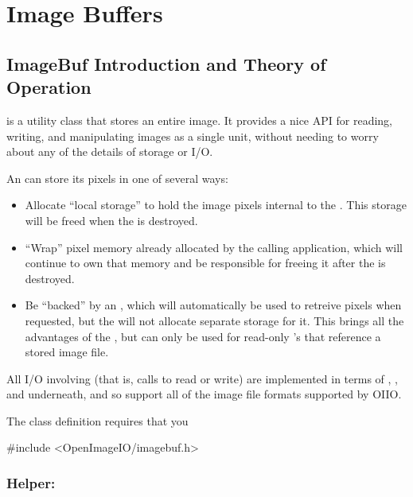 \chapter{Image Buffers}
\label{chap:imagebuf}

\section{ImageBuf Introduction and Theory of Operation}
\label{sec:imagebuf:intro}

\ImageBuf is a utility class that stores an entire image.  It provides a
nice API for reading, writing, and manipulating images as a single unit,
without needing to worry about any of the details of storage or I/O.

\smallskip

\noindent An \ImageBuf can store its pixels in one of several ways:

\begin{itemize}
\item Allocate ``local storage'' to hold the image pixels
internal to the \ImageBuf.  This storage will be freed when the
\ImageBuf is destroyed.
\item ``Wrap'' pixel memory already allocated by the calling application,
which will continue to own that memory and be responsible for freeing
it after the \ImageBuf is destroyed.
\item Be ``backed'' by an \ImageCache, which will automatically be used
to retreive pixels when requested, but the \ImageBuf will not allocate
separate storage for it.  This brings all the advantages of the
\ImageCache, but can only be used for read-only \ImageBuf's that
reference a stored image file.
\end{itemize}

All I/O involving \ImageBuf (that is, calls to {\cf read} or {\cf write})
are implemented in terms of \ImageCache, \ImageInput,
and \ImageOutput underneath, and so support all of the image file
formats supported by OIIO.

\smallskip

\noindent The \ImageBuf class definition requires that you
\begin{code}
  #include <OpenImageIO/imagebuf.h>
\end{code}

\subsection{Helper: \ROI}
\label{sec:ROI}

